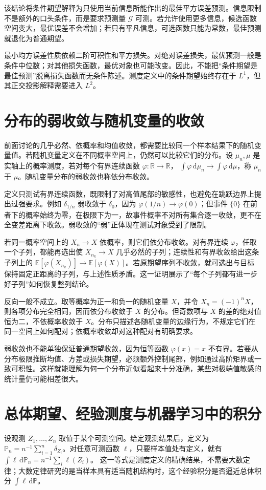 \documentclass[UTF8,12pt,a4paper,fontset=fandol]{ctexbook}
\begin{document}
该结论将条件期望解释为只使用当前信息所能作出的最佳平方误差预测。信息限制不是额外的口头条件，而是要求预测量 $\mathcal G$ 可测。若允许使用更多信息，候选函数空间变大，最优误差不会增加；若只有平凡信息，可选函数只能为常数，最佳预测就退化为普通期望。

最小均方误差性质依赖二阶可积性和平方损失。对绝对误差损失，最优预测一般是条件中位数；对其他损失函数，最优对象也可能改变。因此，不能把“条件期望是最佳预测”脱离损失函数而无条件陈述。测度定义中的条件期望始终存在于 $L^1$，但其正交投影解释需要进入 $L^2$。

\section{分布的弱收敛与随机变量的收敛}
前面讨论的几乎必然、依概率和均值收敛，都需要比较同一个样本结果下的随机变量值。若随机变量定义在不同概率空间上，仍然可以比较它们的分布。设 $\mu_n,\mu$ 是实轴上的概率测度，若对每个有界连续函数 $\varphi:\mathbb R\to\mathbb R$，
$\int\varphi\,\mathrm d\mu_n\to\int\varphi\,\mathrm d\mu$，称 $\mu_n$ 于 $\mu$。随机变量分布的弱收敛也称依分布收敛。

定义只测试有界连续函数，既限制了对高值尾部的敏感性，也避免在跳跃边界上提出过强要求。例如 $\delta_{1/n}$ 弱收敛于 $\delta_0$，因为 $\varphi(1/n)\to\varphi(0)$；但事件 $\{0\}$ 在前者下的概率始终为零，在极限下为一，故事件概率不对所有集合逐一收敛，更不在全变差距离下收敛。弱收敛的“弱”正体现在测试对象受到了限制。

若同一概率空间上的 $X_n\to X$ 依概率，则它们依分布收敛。对有界连续 $\varphi$，任取一个子列，都能再选出使 $X_{n_k}\to X$ 几乎必然的子列；连续性和有界收敛给出这条子列上的 $\mathbb E[\varphi(X_{n_k})]\to\mathbb E[\varphi(X)]$。若原期望序列不收敛，就可选出与目标保持固定正距离的子列，与上述性质矛盾。这一证明展示了“每个子列都有进一步好子列”如何恢复整列结论。

反向一般不成立。取等概率为正一和负一的随机变量 $X$，并令 $X_n=(-1)^nX$，则各项分布完全相同，因而依分布收敛于 $X$ 的分布。但奇数项与 $X$ 的差的绝对值恒为二，不依概率收敛于 $X$。分布只描述各随机变量的边缘行为，不规定它们在同一空间上如何配对；依概率收敛却对这种配对有明确要求。

弱收敛也不能单独保证普通期望收敛，因为恒等函数 $\varphi(x)=x$ 不有界。若要从分布极限推断均值、方差或损失期望，必须额外控制尾部，例如通过高阶矩界或一致可积性。这样就能理解为何一个分布近似看起来十分准确，某些对极端值敏感的统计量仍可能相差很大。

\section{总体期望、经验测度与机器学习中的积分}
设观测 $Z_1,\ldots,Z_n$ 取值于某个可测空间。给定观测结果后，定义为
$\mathbb P_n=n^{-1}\sum_{i=1}^{n}\delta_{Z_i}$。对任意可测函数 $\ell$，只要样本值处有定义，就有
$\int\ell\,\mathrm d\mathbb P_n=n^{-1}\sum_i\ell(Z_i)$。
这一等式是测度定义的精确结果，不需要大数定律；大数定律研究的是当样本具有适当随机结构时，这个经验积分是否逼近总体积分 $\int\ell\,\mathrm d\mathbb P$。
\end{document}
